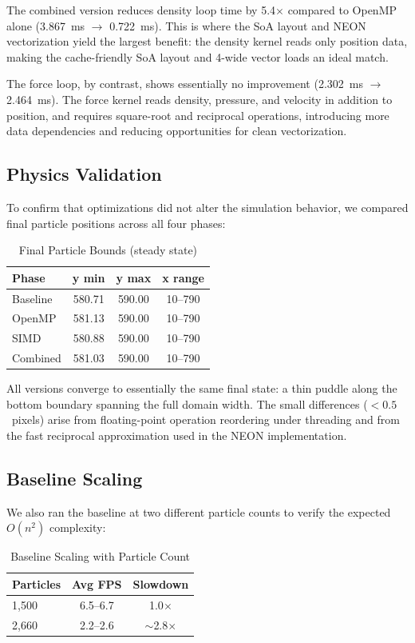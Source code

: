 \documentclass[12pt, a4paper]{article}
\begin{document}
The combined version reduces density loop time by 5.4$\times$ compared to OpenMP alone (3.867~ms $\to$ 0.722~ms). This is where the SoA layout and NEON vectorization yield the largest benefit: the density kernel reads only position data, making the cache-friendly SoA layout and 4-wide vector loads an ideal match.

The force loop, by contrast, shows essentially no improvement (2.302~ms $\to$ 2.464~ms). The force kernel reads density, pressure, and velocity in addition to position, and requires square-root and reciprocal operations, introducing more data dependencies and reducing opportunities for clean vectorization.

\subsection{Physics Validation}
To confirm that optimizations did not alter the simulation behavior, we compared final particle positions across all four phases:

\begin{table}[h]
\centering
\caption{Final Particle Bounds (steady state)}
\label{tab:validation}
\begin{tabular}{@{}lccc@{}}
\toprule
\textbf{Phase} & \textbf{y min} & \textbf{y max} & \textbf{x range} \\ \midrule
Baseline  & 580.71 & 590.00 & 10--790 \\
OpenMP    & 581.13 & 590.00 & 10--790 \\
SIMD      & 580.88 & 590.00 & 10--790 \\
Combined  & 581.03 & 590.00 & 10--790 \\ \bottomrule
\end{tabular}
\end{table}

All versions converge to essentially the same final state: a thin puddle along the bottom boundary spanning the full domain width. The small differences ($< 0.5$~pixels) arise from floating-point operation reordering under threading and from the fast reciprocal approximation used in the NEON implementation.

\subsection{Baseline Scaling}
We also ran the baseline at two different particle counts to verify the expected $O(n^2)$ complexity:

\begin{table}[h]
\centering
\caption{Baseline Scaling with Particle Count}
\label{tab:scaling}
\begin{tabular}{@{}lcc@{}}
\toprule
\textbf{Particles} & \textbf{Avg FPS} & \textbf{Slowdown} \\ \midrule
1,500 & 6.5--6.7 & 1.0$\times$ \\
2,660 & 2.2--2.6 & $\sim$2.8$\times$ \\ \bottomrule
\end{tabular}
\end{table}
\end{document}
